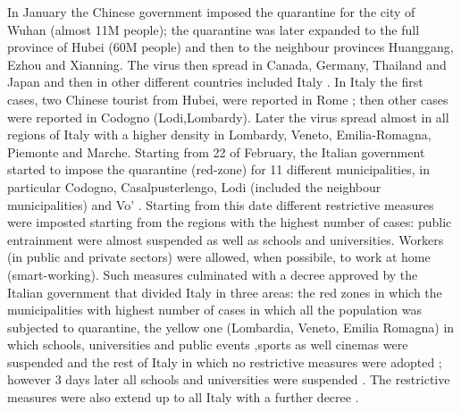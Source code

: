 \documentclass[
12pt, %
a4paper, %
oneside, %
headinclude,footinclude, %
BCOR5mm, %
]{scrartcl}
\begin{document}
In January the Chinese government imposed the quarantine for the city of Wuhan (almost 11M people); the quarantine was later expanded to the full province of Hubei (60M people) and then to the neighbour provinces Huanggang, Ezhou and Xianning. 
The virus then spread in Canada, Germany, Thailand and Japan and then in other different countries included Italy \cite{timeline+web}. In Italy the first cases, two Chinese tourist from Hubei, were reported in Rome \cite{corr+roma}; then  other cases were reported in Codogno (Lodi,Lombardy). Later the virus spread almost in all regions of Italy with a higher density in Lombardy, Veneto, Emilia-Romagna, Piemonte and Marche. Starting from 22 of February, the Italian government started to impose the quarantine (red-zone) for 11 different municipalities, in particular Codogno, Casalpusterlengo, Lodi (included the neighbour municipalities) and Vo' . Starting from this date different restrictive measures were imposted starting from the regions with the highest number of cases: public entrainment were almost suspended as well as schools and universities. Workers (in public and private sectors) were allowed, when possibile, to work at home (smart-working). Such measures culminated with a decree approved by the Italian government that divided Italy in three areas: the red zones in which the municipalities with highest number of cases in which all the population was subjected to quarantine, the yellow one (Lombardia, Veneto, Emilia Romagna) in which schools, universities and public events ,sports  as well cinemas were suspended and the rest of Italy in which no restrictive measures were adopted \cite{rep+dec1}; however 3 days later all schools and universities were suspended \cite{guard+01}. The restrictive measures were also extend up to all Italy with a further decree \cite{11marzo}. 
\end{document}
